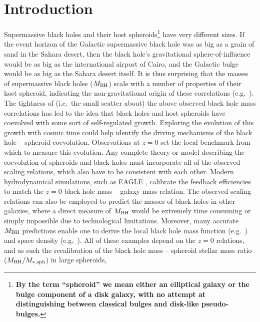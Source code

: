 \documentclass[preprint2]{emulateapj}
\begin{document}
\section{Introduction}
\label{sec:int}
Supermassive black holes and their host spheroids\footnote{\bf By the term ``spheroid'' 
we mean either an elliptical galaxy or the bulge component of a disk galaxy, 
with no attempt at distinguishing between classical bulges and disk-like pseudo-bulges. } 
have very different sizes. 
If the event horizon of the Galactic supermassive black hole was as big as a grain of sand in the Sahara desert, 
then the black hole's gravitational sphere-of-influence would be as big as the international airport of Cairo, 
and the Galactic bulge would be as big as the Sahara desert itself.
It is thus surprising that the masses of supermassive black holes ($M_{\rm BH}$) 
scale with a number of properties of their host spheroid, 
indicating the non-gravitational origin of these correlations 
(e.g.~\citealt{dressler1989,yee1992,kormendyrichstone1995,laor1997,magorrian1998,ferraresemerritt2000,gebhardt2000,graham2001,
marconihunt2003,haringrix2004,grahamscott2015}). \\
The tightness of (i.e.~the small scatter about) the above observed black hole mass correlations has led to the idea
that black holes and host spheroids have coevolved with some sort of self-regulated growth.
Exploring the evolution of this growth with cosmic time could help identify
the driving mechanisms of the black hole -- spheroid coevolution.
Observations at $z=0$ set the local benchmark from which to measure this evolution.
Any complete theory or model describing the coevolution of spheroids and black holes must incorporate 
all of the observed scaling relations, which also have to be consistent with each other.
Modern hydrodynamical simulations, such as EAGLE \citep{schaye2015}, calibrate the feedback efficiencies 
to match the $z=0$ black hole mass -- galaxy mass relation.
The observed scaling relations can also be employed to predict the masses of black holes in other galaxies, where a direct
measure of $M_{\rm BH}$ would be extremely time consuming or simply impossible due to technological limitations.
Moreover, many accurate $M_{\rm BH}$ predictions enable one to derive 
the local black hole mass function (e.g.~\citealt{salucci1999,graham2007smbhmassfunction,shankar2009,shankar2013,fontanot2015}) 
and space density (e.g.~\citealt{grahamdriver2007smbhmassdensity,comastri2015}). 
All of these examples depend on the $z=0$ relations, 
and as such the recalibration of the black hole mass -- spheroid stellar mass ratio ($M_{\rm BH}/M_{\rm *,sph}$) in large spheroids,
\end{document}
